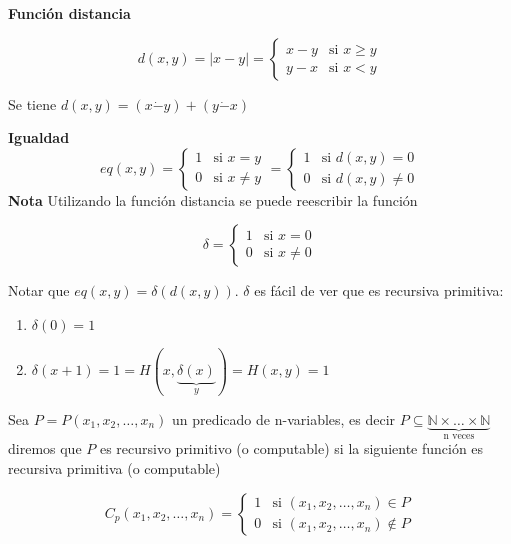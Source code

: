 \begin{example}
\textbf{Funci\'on distancia}
 
\[
d(x, y) = |x - y| =
\begin{cases}
x - y		&\text{si $x \geq y$}	\\
y - x		&\text{si $x < y$}
\end{cases}
\]
 
Se tiene $d(x, y) = (x \dot{-} y) + (y \dot{-} x)$
 
\end{example}
 
\begin{example}
\textbf{Igualdad}
\[
eq(x, y) =
\begin{cases}
1			&\text{si $x = y$}			\\
0			&\text{si $x \neq y$}
\end{cases}
=
\begin{cases}
1			&\text{si $d(x, y) = 0$}	\\
0			&\text{si $d(x, y) \neq 0$}
\end{cases}
\]
\textbf{Nota} Utilizando la funci\'on distancia se puede reescribir la funci\'on
\end{example}
 
\begin{example}
 
\[
\delta =
\begin{cases}
1			&\text{si $x = 0$}		\\
0			&\text{si $x \neq 0$}		
\end{cases}
\]
 
Notar que $eq(x, y) = \delta(d(x, y))$. $\delta$ es f\'acil de ver que es recursiva primitiva:
 
\begin{enumerate}
	\item[] $\delta(0) = 1$
	\item[] $\delta(x + 1) = 1 = H(x,\underbrace{\delta(x)}_{y}) = H(x, y) = 1$
\end{enumerate}
 
\end{example}
 
 
\begin{definition}
Sea $P = P(x_1, x_2, \ldots, x_n)$ un predicado de n-variables, es decir $P \subseteq \underbrace{\mathbb{N} \times \ldots \times \mathbb{N}}_{\text{n veces}}$ diremos que $P$ es recursivo primitivo (o computable) si la siguiente funci\'on es recursiva primitiva (o computable)
 
\[
C_p(x_1, x_2, \ldots, x_n) =
\begin{cases}
1	&\text{si $(x_1, x_2, \ldots, x_n) \in P$}	\\
0	&\text{si $(x_1, x_2, \ldots, x_n) \notin P$}
\end{cases}
\]
 
\end{definition}
 

